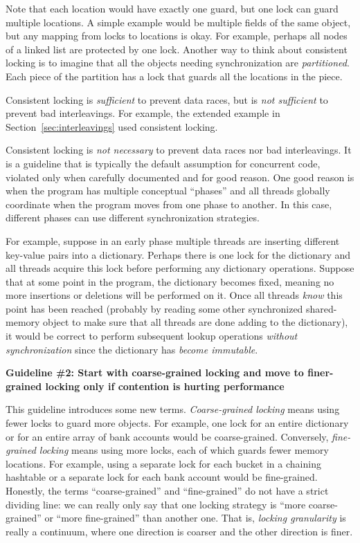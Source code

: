 \documentclass[10pt]{article}
\begin{document}
  Note that each location would have exactly one guard, but one lock can
  guard multiple locations.  A simple example would be multiple fields
  of the same object, but any mapping from locks to locations is
  okay.  For example, perhaps all nodes of a linked list are protected
  by one lock.  Another way to think about consistent locking is
  to imagine that all the objects needing synchronization are
  \emph{partitioned}.  Each piece of the partition has a lock that
  guards all the locations in the piece.
  
  Consistent locking is \emph{sufficient} to prevent data races, but
  is \emph{not sufficient} to prevent bad interleavings.  For example,
  the extended example in Section~\ref{sec:interleavings} used
  consistent locking.
  
  Consistent locking is \emph{not necessary} to prevent data races nor
  bad interleavings.  It is a guideline that is typically the default
  assumption for concurrent code, violated only when carefully
  documented and for good reason.  One good reason is when the program
  has multiple conceptual ``phases'' and all threads globally
  coordinate when the program moves from one phase to another.  In
  this case, different phases can use different synchronization
  strategies.

  For example, suppose in an early phase multiple threads are
  inserting different key-value pairs into a dictionary.  Perhaps
  there is one lock for the dictionary and all threads acquire this
  lock before performing any dictionary operations.  Suppose that at
  some point in the program, the dictionary becomes fixed, meaning no
  more insertions or deletions will be performed on it.  Once all threads
  \emph{know} this point has been reached (probably by reading some
  other synchronized shared-memory object to make sure that all
  threads are done adding to the dictionary), it would be correct to
  perform subsequent lookup operations \emph{without synchronization}
  since the dictionary has \emph{become immutable}.

\medskip
\noindent\textbf{Guideline \#2: Start with coarse-grained locking and
  move to finer-grained locking only if contention is hurting performance}
\medskip

This guideline introduces some new terms.  \emph{Coarse-grained
  locking} means using fewer locks to guard more objects.  For
example, one lock for an entire dictionary or for an entire array of
bank accounts would be coarse-grained.  Conversely, \emph{fine-grained
  locking} means using more locks, each of which guards fewer memory
locations.  For example, using a separate lock for each bucket in a
chaining hashtable or a separate lock for each bank account would be
fine-grained.  Honestly, the terms ``coarse-grained'' and
``fine-grained'' do not have a strict dividing line: we can really
only say that one locking strategy is ``more coarse-grained'' or
``more fine-grained'' than another one.  That is, \emph{locking
  granularity} is really a continuum, where one direction is coarser
and the other direction is finer.
\end{document}
